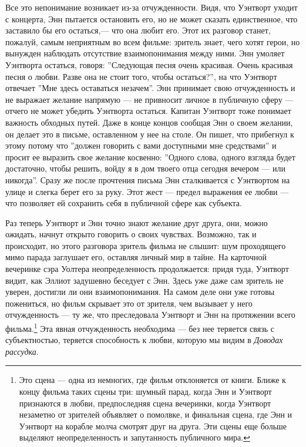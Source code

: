 \documentclass[12pt]{book}
\begin{document}
Все это непонимание возникает из-за отчужденности. Видя, что Уэнтворт уходит с концерта, Энн пытается остановить его, но не может сказать единственное, что заставило бы его остаться,--- что она любит его. Этот их разговор станет, пожалуй, самым неприятным во всем фильме: зритель знает, чего хотят герои, но вынужден наблюдать отсутствие взаимопонимания между ними. Энн умоляет Уэнтворта остаться, говоря: ''Следующая песня очень красивая. Очень красивая песня о любви. Разве она не стоит того, чтобы остаться?'', на что Уэнтворт отвечает ''Мне здесь оставаться незачем''. Энн принимает свою отчужденность и не выражает желание напрямую --- не привносит личное в публичную сферу --- отчего не может убедить Уэнтворта остаться.
Капитан Уэнтворт тоже понимает важность обходных путей. Даже в конце концов сообщая Энн о своем желании, он делает это в письме, оставленном у нее на столе. Он пишет, что прибегнул к этому потому что ''должен говорить с вами доступными мне средствами'' и просит ее выразить свое желание косвенно: ''Одного слова, одного взгляда будет достаточно, чтобы решить, войду я в дом твоего отца сегодня вечером --- или никогда''. Сразу же после прочтения письма Энн сталкивается с Уэнтвортом на улице и слегка берет его за руку. Этот жест --- предел выражения ее любви --- что позволяет ей сохранить себя в публичной сфере как субъекта.

Раз теперь Уэнтворт и Энн точно знают желание друг друга, они, можно ожидать, начнут открыто говорить о своих чувствах. Возможно, так и происходит, но этого разговора зритель фильма не слышит: шум проходящего мимо парада заглушает его, оставляя личный мир в тайне. На карточной вечеринке сэра Уолтера неопределенность продолжается: придя туда, Уэнтворт видит, как Эллиот задушевно беседует с Энн. Здесь уже даже сам зритель не уверен, достигли ли они взаимопонимания. На самом деле они уже готовы пожениться, но фильм скрывает это от зрителя, чем вызывает у него отчужденность --- ту же, что преследовала Уэнтворт и Энн на протяжении всего фильма.\footnote{Это сцена --- одна из немногих, где фильм отклоняется от книги. Ближе к концу фильма таких сцены три: шумный парад, когда Энн и Уэнтворт признаются в любви, предпоследняя сцена вечеринки, когда Уэнтворт незаметно от зрителей объявляет о помолвке, и финальная сцена, где Энн и Уэнтворт на корабле молча смотрят друг на друга. Эти сцены еще больше выделяют неопределенность и запутанность публичного мира.} Эта явная отчужденность необходима --- без нее теряется связь с субъектностью, теряется способность к любви, которую мы видим в \textit{Доводах рассудка}.
\end{document}
